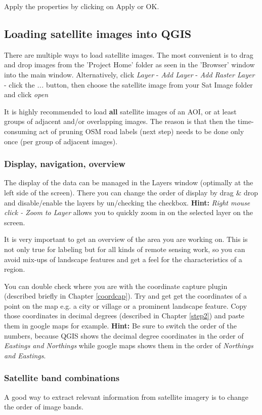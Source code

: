 \documentclass[12pt,a4paper]{scrartcl}
\begin{document}
Apply the properties by clicking on Apply or OK.


\subsection{Loading satellite images into QGIS}
\label{step3}
There are multiple ways to load satellite images. The most convenient is to drag and drop images from the 'Project Home' folder as seen in the 'Browser' window into the main window. Alternatively, click \textit{Layer} - \textit{Add Layer} - \textit{Add Raster Layer} - click the \textit{...} button, then choose the satellite image from your Sat Image folder and click \textit{open}

It is highly recommended to load \textbf{all} satellite images of an AOI, or at least groups of adjacent and/or overlapping images. The reason is that then the time-consuming act of pruning OSM road labels (next step) needs to be done only once (per group of adjacent images).


\subsubsection{Display, navigation, overview}
The display of the data can be managed in the Layers window (optimally at the left side of the screen). There you can change the order of display by drag \& drop and disable/enable the layers by un/checking the checkbox. \textbf{Hint:} \textit{Right mouse click - Zoom to Layer} allows you to quickly zoom in on the selected layer on the screen.

It is very important to get an overview of the area you are working on. This is not only true for labeling but for all kinds of remote sensing work, so you can avoid mix-ups of landscape features and get a feel for the characteristics of a region.  

You can double check where you are with the coordinate capture plugin (described briefly in Chapter \ref{coordcap}).
Try and get get the coordinates of a point on the map e.g. a city or village or a prominent landscape feature. 
Copy those coordinates in decimal degrees (described in Chapter \ref{step2}) and paste them in google maps for example. \textbf{Hint:} Be sure to switch the order of the numbers, because QGIS shows the decimal degree coordinates in the order of \textit{Eastings and Northings} while google maps shows them in the order of \textit{Northings and Eastings}.

\subsubsection{Satellite band combinations}
A good way to extract relevant information from satellite imagery is to change the order of image bands.
\end{document}
